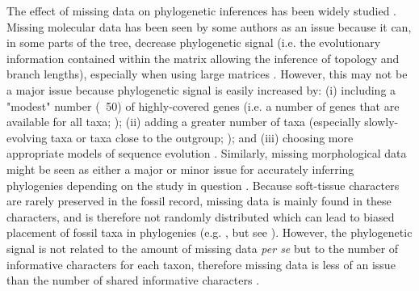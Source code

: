 \documentclass[12pt,letterpaper]{article}
\begin{document}
The effect of missing data on phylogenetic inferences has been widely studied \citep{wiensmissing2003,wiensmissing2006,wiensmissing2008,lemmonthe2009,rouresite-specific2011,sansomfossilization2013,pattinsonphylogeny2014,sansombias2014}. Missing molecular data has been seen by some authors as an issue because it can, in some parts of the tree, decrease phylogenetic signal (i.e. the evolutionary information contained within the matrix allowing the inference of topology and branch lengths), especially when using large matrices \citep{lemmonthe2009}. However, this may not be a major issue because phylogenetic signal is easily increased by: (i) including a "modest" number ($~$ %
50) of highly-covered genes (i.e. a number of genes that are available for all taxa; \citealt{rouresite-specific2011}); (ii) adding a greater number of taxa (especially slowly-evolving taxa or taxa close to the outgroup; \citealt{rouresite-specific2011}); and (iii) choosing more appropriate models of sequence evolution \citep{wiensmissing2006,wiensmissing2008,rouresite-specific2011}. Similarly, missing morphological data might be seen as either a major or minor issue for accurately inferring phylogenies depending on the study in question \citep{wiensmissing2003,sansomfossilization2013,pattinsonphylogeny2014}. Because soft-tissue characters are rarely preserved in the fossil record, missing data is mainly found in these characters, and is therefore not randomly distributed which can lead to biased placement of fossil taxa in phylogenies (e.g. \citealt{sansomfossilization2013}, but see \citealt{pattinsonphylogeny2014}). However, the phylogenetic signal is not related to the amount of missing data \textit{per se} but to the number of informative characters for each taxon, therefore missing data is less of an issue than the number of shared informative characters \citep{kearneyfragmentary2002,wiensmissing2003,pattinsonphylogeny2014}.
\end{document}
